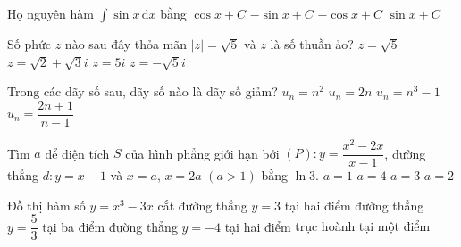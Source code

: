 \begin{ex}%
Họ nguyên hàm $\displaystyle\int\limits \sin x \mathrm{\,d}x$ bằng
\choice
{$\cos x+C$}
{$-\sin x+C$}
{\True $-\cos x+C$}
{$\sin x+C$}
\end{ex}

\begin{ex}%
Số phức $z$ nào sau đây thỏa mãn $|z|=\sqrt{5}$ và $z$ là số thuần ảo?
\choice
{$z=\sqrt{5}$}
{$z=\sqrt{2}+\sqrt{3}i$}
{$z=5i$}
{\True $z=-\sqrt{5}i$}
\end{ex}

\begin{ex}%
Trong các dãy số sau, dãy số nào là dãy số giảm?
\choice
{$u_n=n^2$}
{$u_n=2n$}
{$u_n=n^3-1$}
{\True $u_n=\dfrac{2n+1}{n-1}$}
\end{ex}

\begin{ex}%
Tìm $a$ để diện tích $S$ của hình phẳng giới hạn bởi $(P)\colon y=\dfrac{x^2-2x}{x-1}$, đường thẳng $d\colon y=x-1$ và $x=a$, $x=2a$ $(a>1)$ bằng $\ln 3$.
\choice
{$a=1$}
{$a=4$}
{$a=3$}
{\True $a=2$}
\end{ex}

\begin{ex}%
Đồ thị hàm số $y=x^3-3x$ cắt 
\choice
{đường thẳng $y=3$ tại hai điểm}
{\True đường thẳng $y=\dfrac{5}{3}$ tại ba điểm}
{đường thẳng $y=-4$ tại hai điểm}
{trục hoành tại một điểm}
\end{ex}

